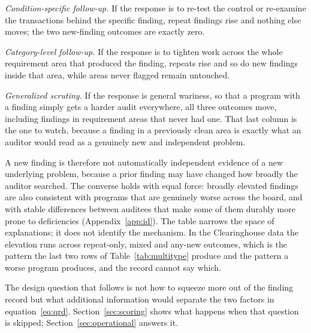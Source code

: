 \emph{Condition-specific follow-up.} If the response is to re-test the control
or re-examine the transactions behind the specific finding, repeat findings
rise and nothing else moves; the two new-finding outcomes are exactly zero.

\emph{Category-level follow-up.} If the response is to tighten work across the
whole requirement area that produced the finding, repeats rise and so do new
findings inside that area, while areas never flagged remain untouched.

\emph{Generalized scrutiny.} If the response is general wariness, so that a
program with a finding simply gets a harder audit everywhere, all three
outcomes move, including findings in requirement areas that never had one.
That last column is the one to watch, because a finding in a previously clean
area is exactly what an auditor would read as a genuinely new and independent
problem.

A new finding is therefore not automatically independent evidence of a new
underlying problem, because a prior finding may have changed how broadly the
auditor searched. The converse holds with equal force: broadly elevated
findings are also consistent with programs that are genuinely worse across the
board, and with stable differences between auditees that make some of them
durably more prone to deficiencies (Appendix~\ref{app:id}). The table narrows the space of explanations; it does not identify the
mechanism. In the Clearinghouse data the elevation runs across repeat-only,
mixed and any-new outcomes, which is the pattern the last two rows of
Table~\ref{tab:multitype} produce and the pattern a worse program produces,
and the record cannot say which.

The design question that follows is not how to squeeze more out of the
finding record but what additional information would separate the two factors
in equation~\eqref{eq:qrd}. Section~\ref{sec:scoring} shows what happens when
that question is skipped; Section~\ref{sec:operational} answers it.


